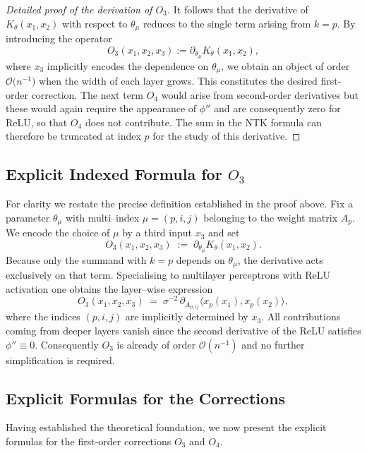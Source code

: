\documentclass[11pt,a4paper]{article}
\theoremstyle{definition}
\begin{document}
\begin{proof}[Detailed proof of the derivation of $O_3$]
It follows that the derivative of $K_{\theta}(x_1,x_2)$ with respect to $\theta_{\mu}$ reduces to the single term arising from $k=p$. By introducing the operator
\[
 O_3(x_1,x_2,x_3):=\partial_{\theta_{\mu}}K_{\theta}(x_1,x_2),
\]
where $x_3$ implicitly encodes the dependence on $\theta_{\mu}$, we obtain an object of order $\mathcal O\bigl(n^{-1}\bigr)$ when the width of each layer grows. This constitutes the desired first-order correction. The next term $O_4$ would arise from second-order derivatives but these would again require the appearance of $\phi''$ and are consequently zero for ReLU, so that $O_4$ does not contribute. The sum in the NTK formula can therefore be truncated at index $p$ for the study of this derivative.
\end{proof}

\subsection{Explicit Indexed Formula for $O_3$}
For clarity we restate the precise definition established in the proof above.  
Fix a parameter $\theta_{\mu}$ with multi--index $\mu=(p,i,j)$ belonging to the weight matrix $A_p$.  We encode the choice of $\mu$ by a third input $x_3$ and set
\[
  O_3(x_1,x_2,x_3)\;:=\;\partial_{\theta_{\mu}}K_{\theta}(x_1,x_2).
\]
Because only the summand with $k=p$ depends on $\theta_{\mu}$, the derivative acts exclusively on that term.  Specialising to multilayer perceptrons with ReLU activation one obtains the layer–wise expression
\begin{equation}\label{eq:O3layer}
  O_3(x_1,x_2,x_3)\;=\;\sigma^{-2}\,\partial_{A_{p,ij}}\bigl\langle x_p(x_1),x_p(x_2)\bigr\rangle,
\end{equation}
where the indices $(p,i,j)$ are implicitly determined by $x_3$.  All contributions coming from deeper layers vanish since the second derivative of the ReLU satisfies $\phi''\equiv 0$.  Consequently $O_3$ is already of order $\mathcal{O}(n^{-1})$ and no further simplification is required.

\subsection{Explicit Formulas for the Corrections}

Having established the theoretical foundation, we now present the explicit formulas for the first-order corrections $O_3$ and $O_4$.
\end{document}
